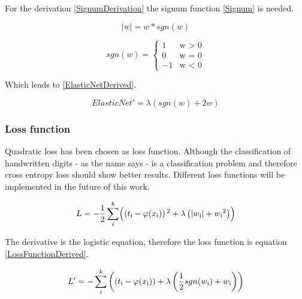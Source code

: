 \documentclass[11pt]{article}
\begin{document}
For the derivation \eqref{SignumDerivation} the signum function \eqref{Signum} is needed.

\begin{equation}
\label{SignumDerivation}
|w| = w * sgn(w)
\end{equation}

\begin{equation}
\label{Signum}
sgn(w) = \begin{cases}
1 & \text{w > 0}\\
0 & \text{w = 0}\\
-1 & \text{w < 0}
\end{cases}
\end{equation}

Which leads to \eqref{ElasticNetDerived}.

\begin{equation}
\label{ElasticNetDerived}
ElasticNet' = \lambda(sgn(w) + 2w)
\end{equation}

\subsubsection{Loss function}
Quadratic loss has been chosen as loss function. Although the classification of handwritten digits - as the name says - is a classification problem and therefore cross entropy loss should show better results. Different loss functions will be implemented in the future of this work.

\begin{equation}
\label{LossFunction}
L = - \frac{1}{2} \sum\limits_{i}^{k} \Bigl(\left(t\textsubscript{i} - \varphi(x\textsubscript{i})\right)\textsuperscript{2} + \lambda \left( |w\textsubscript{i}| + w\textsubscript{i}\textsuperscript{2} \right)\Bigr)
\end{equation}


The derivative is the logistic equation, therefore the loss function is equation \eqref{LossFunctionDerived}.

\begin{equation}
\label{LossFunctionDerived}
L' = - \sum\limits_{i}^{k} \left(\left(t\textsubscript{i} - \varphi(x\textsubscript{i})\right) + \lambda \left( \frac{1}{2}sgn(w\textsubscript{i}) + w\textsubscript{i} \right)\right)
\end{equation}
\end{document}
